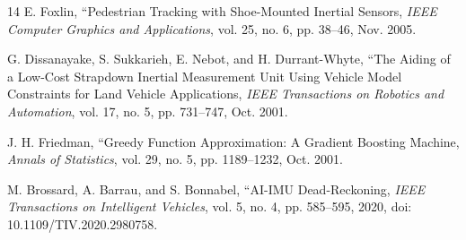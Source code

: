 \documentclass[conference]{IEEEtran}
\begin{document}
\begin{thebibliography}{14}
 E. Foxlin, ``Pedestrian Tracking with Shoe-Mounted Inertial Sensors, \emph{IEEE Computer Graphics and Applications}, vol. 25, no. 6, pp. 38--46, Nov. 2005.

 G. Dissanayake, S. Sukkarieh, E. Nebot, and H. Durrant-Whyte, ``The Aiding of a Low-Cost Strapdown Inertial Measurement Unit Using Vehicle Model Constraints for Land Vehicle Applications, \emph{IEEE Transactions on Robotics and Automation}, vol. 17, no. 5, pp. 731--747, Oct. 2001.

 J. H. Friedman, ``Greedy Function Approximation: A Gradient Boosting Machine, \emph{Annals of Statistics}, vol. 29, no. 5, pp. 1189--1232, Oct. 2001.

 M. Brossard, A. Barrau, and S. Bonnabel, ``AI-IMU Dead-Reckoning, \emph{IEEE Transactions on Intelligent Vehicles}, vol. 5, no. 4, pp. 585--595, 2020, doi: 10.1109/TIV.2020.2980758.

\end{thebibliography}
\end{document}
